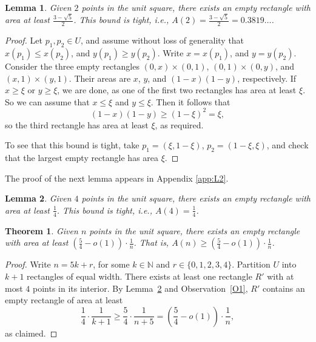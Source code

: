 \documentclass[11pt]{article}
\newtheorem{theorem}{Theorem}
\newtheorem{lemma}{Lemma}
\newcommand{\NN}{\mathbb{N}}
\begin{document}
\begin{lemma} \label{L1}
Given $2$ points in the unit square, there exists an empty rectangle
with area at least $\frac{3-\sqrt{5}}{2}$. 
This bound is tight, i.e., $A(2)=\frac{3-\sqrt{5}}{2}=0.3819\ldots$.
\end{lemma}
\begin{proof}
Let $p_1,p_2 \in U$, and assume without loss of generality
that $x(p_1) \leq x(p_2)$, and  $y(p_1) \geq y(p_2)$. Write
$x=x(p_1)$, and $y=y(p_2)$. 
Consider the three empty rectangles $(0,x)\times(0,1)$,
$(0,1)\times(0,y)$, and
$(x,1)\times(y,1)$.
Their areas are $x$, $y$, and $(1-x)(1-y)$, respectively. 
If $x \geq \xi$ or $y \geq \xi$,
we are done, as one of the first two rectangles has area at least
$\xi$. So we can assume that $x \leq \xi$ and $y \leq \xi$.
Then it follows that
$$ (1-x)(1-y) \geq (1-\xi)^2=\xi, $$
so the third rectangle has area at least $\xi$, as required.

To see that this bound is tight, take $p_1=(\xi,1-\xi)$,
$p_2=(1-\xi,\xi)$, and check that the largest empty rectangle has area $\xi$. 
\end{proof}

The proof of the next lemma appears in Appendix \ref{app:L2}.

\begin{lemma} \label{L2}
Given $4$ points in the unit square, there exists an empty rectangle
with area at least $\frac{1}{4}$. This bound is tight, i.e.,
$A(4)=\frac{1}{4}$.  
\end{lemma}





\begin{theorem} \label{T2}
Given $n$ points in the unit square, there exists an empty rectangle
with area at least $(\frac{5}{4}-o(1)) \cdot \frac{1}{n}$. 
That is, $A(n) \geq (\frac{5}{4}-o(1)) \cdot \frac{1}{n}$. 
\end{theorem}
\begin{proof}
Write $n=5k+r$, for some $k \in \NN$ and $r \in \{0,1,2,3,4\}$. 
Partition $U$ into $k+1$ rectangles of equal width. There exists
at least one rectangle $R'$ with at most $4$ points in its interior. 
By Lemma~\ref{L2} and Observation~\ref{O1}, 
$R'$ contains an empty rectangle of area at least
$$ \frac{1}{4} \cdot \frac{1}{k+1} \geq \frac{5}{4} \cdot \frac{1}{n+5} 
= \left(\frac{5}{4}-o(1)\right) \cdot \frac{1}{n}, $$
as claimed.
\end{proof}
\end{document}
